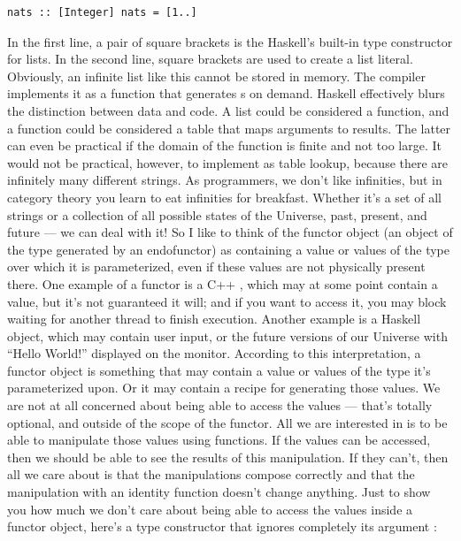 \begin{verbatim}
nats :: [Integer] nats = [1..]
\end{verbatim}
In the first line, a pair of square brackets is the Haskell's built-in
type constructor for lists. In the second line, square brackets are used
to create a list literal. Obviously, an infinite list like this cannot
be stored in memory. The compiler implements it as a function that
generates s on demand. Haskell effectively blurs the
distinction between data and code. A list could be considered a
function, and a function could be considered a table that maps arguments
to results. The latter can even be practical if the domain of the
function is finite and not too large. It would not be practical,
however, to implement  as table lookup, because there are
infinitely many different strings. As programmers, we don't like
infinities, but in category theory you learn to eat infinities for
breakfast. Whether it's a set of all strings or a collection of all
possible states of the Universe, past, present, and future --- we can
deal with it! So I like to think of the functor object (an object of the
type generated by an endofunctor) as containing a value or values of the
type over which it is parameterized, even if these values are not
physically present there. One example of a functor is a C++
, which may at some point contain a value, but it's
not guaranteed it will; and if you want to access it, you may block
waiting for another thread to finish execution. Another example is a
Haskell  object, which may contain user input, or the future
versions of our Universe with ``Hello World!'' displayed on the monitor.
According to this interpretation, a functor object is something that may
contain a value or values of the type it's parameterized upon. Or it may
contain a recipe for generating those values. We are not at all
concerned about being able to access the values --- that's totally
optional, and outside of the scope of the functor. All we are interested
in is to be able to manipulate those values using functions. If the
values can be accessed, then we should be able to see the results of
this manipulation. If they can't, then all we care about is that the
manipulations compose correctly and that the manipulation with an
identity function doesn't change anything. Just to show you how much we
don't care about being able to access the values inside a functor
object, here's a type constructor that ignores completely its argument
:

